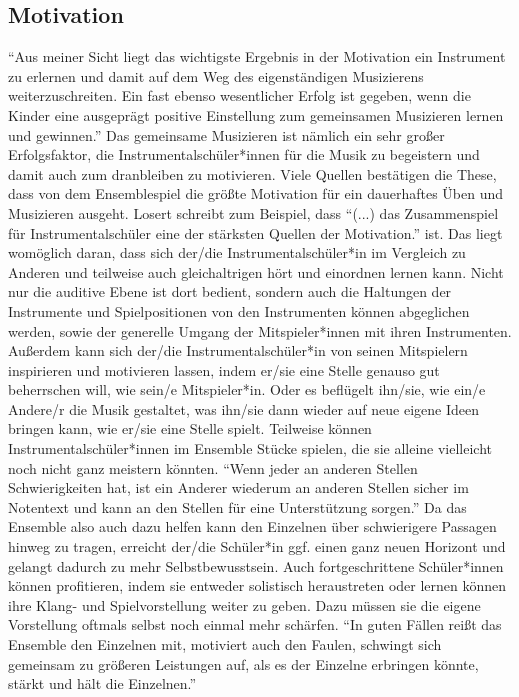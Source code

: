 \subsection{Motivation}

\enquote{Aus meiner Sicht liegt das wichtigste Ergebnis in der Motivation ein
Instrument zu erlernen und damit auf dem Weg des eigenständigen Musizierens
weiterzuschreiten. Ein fast ebenso wesentlicher Erfolg ist gegeben, wenn die
Kinder eine ausgeprägt positive Einstellung zum gemeinsamen Musizieren lernen
und gewinnen.}\autocite[40]{ernst:die_zukunftsfaehige_musikschule} Das
gemeinsame Musizieren ist nämlich ein sehr großer Erfolgsfaktor, die
Instrumentalschüler*innen für die Musik zu begeistern und damit auch zum
dranbleiben zu motivieren. Viele Quellen bestätigen die These, dass von dem
Ensemblespiel die größte Motivation für ein dauerhaftes Üben und Musizieren
ausgeht. Losert schreibt zum Beispiel, dass \enquote{(...) das Zusammenspiel für
Instrumentalschüler eine der stärksten Quellen der Motivation.} ist.
\autocite[92]{losert:die_kunst_zu_unterrichten} Das liegt womöglich daran, dass
sich der/die Instrumentalschüler*in im Vergleich zu Anderen und teilweise auch
gleichaltrigen hört und einordnen lernen kann. Nicht nur die auditive Ebene ist
dort bedient, sondern auch die Haltungen der Instrumente und Spielpositionen von
den Instrumenten können abgeglichen werden, sowie der generelle Umgang der
Mitspieler*innen mit ihren Instrumenten. Außerdem kann sich der/die
Instrumentalschüler*in von seinen Mitspielern inspirieren und motivieren lassen,
indem er/sie eine Stelle genauso gut beherrschen will, wie sein/e Mitspieler*in.
Oder es beflügelt ihn/sie, wie ein/e Andere/r die Musik gestaltet, was ihn/sie
dann wieder auf neue eigene Ideen bringen kann, wie er/sie eine Stelle spielt.
Teilweise können Instrumentalschüler*innen im Ensemble Stücke spielen, die sie
alleine vielleicht noch nicht ganz meistern könnten. \enquote{Wenn jeder an
anderen Stellen Schwierigkeiten hat, ist ein Anderer wiederum an anderen Stellen
sicher im Notentext und kann an den Stellen für eine Unterstützung sorgen.}
\autocite[32]{losert:die_kunst_zu_unterrichten}
Da das Ensemble also auch dazu helfen kann den Einzelnen über schwierigere
Passagen hinweg zu tragen, erreicht der/die Schüler*in ggf. einen ganz neuen
Horizont und gelangt dadurch zu mehr Selbstbewusstsein. Auch fortgeschrittene
Schüler*innen können profitieren, indem sie entweder solistisch heraustreten
oder lernen können ihre Klang- und Spielvorstellung weiter zu geben. Dazu müssen
sie die eigene Vorstellung oftmals selbst noch einmal mehr schärfen. \enquote{In
guten Fällen reißt das Ensemble den Einzelnen mit, motiviert auch den Faulen,
schwingt sich gemeinsam zu größeren Leistungen auf, als es der Einzelne
erbringen könnte, stärkt und hält die Einzelnen.}
